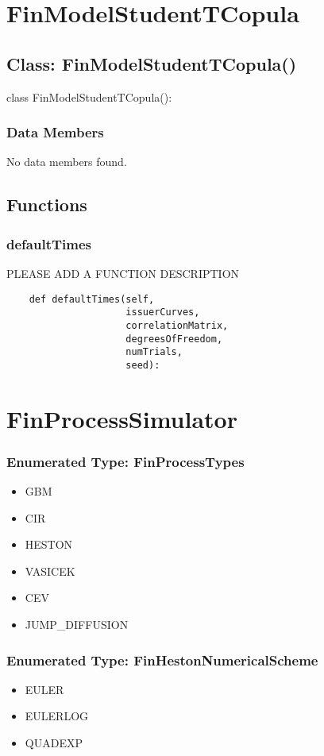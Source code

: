 \documentclass[twoside,11pt]{book}
\begin{document}
\newpage
\section{FinModelStudentTCopula}

\subsection*{Class: FinModelStudentTCopula()}
class FinModelStudentTCopula(): 

\subsubsection*{Data Members}
No data members found.

\subsection*{Functions}

\subsubsection*{{\bf defaultTimes}}
PLEASE ADD A FUNCTION DESCRIPTION

\begin{lstlisting}
    def defaultTimes(self,
                     issuerCurves,
                     correlationMatrix,
                     degreesOfFreedom,
                     numTrials,
                     seed):
\end{lstlisting}

\newpage
\section{FinProcessSimulator}

\subsubsection{Enumerated Type: FinProcessTypes}
\begin{itemize}
\item{GBM}
\item{CIR}
\item{HESTON}
\item{VASICEK}
\item{CEV}
\item{JUMP\_DIFFUSION}
\end{itemize}

\subsubsection{Enumerated Type: FinHestonNumericalScheme}
\begin{itemize}
\item{EULER}
\item{EULERLOG}
\item{QUADEXP}
\end{itemize}
\end{document}
